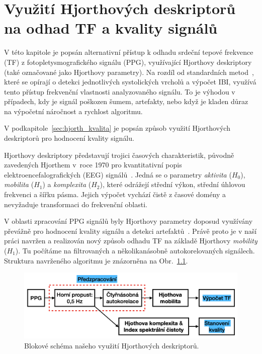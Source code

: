 \chapter{Využití Hjorthových deskriptorů na odhad TF a kvality signálů}
\label{ch:hjorth}
V této kapitole je popsán alternativní přístup k odhadu srdeční tepové frekvence (\acs{TF}) z fotopletysmografického signálu (\acs{PPG}), využívající Hjorthovy deskriptory (také označované jako Hjorthovy parametry).
Na rozdíl od standardních metod~\cite{ENIKÖ,Charlton2022,NeuroKit2}, které se opírají o detekci jednotlivých systolických vrcholů a výpočet \acs{IBI}, využívá tento přístup frekvenční vlastnosti analyzovaného signálu.
To je výhodou v případech, kdy je signál poškozen šumem, artefakty, nebo když je kladen důraz na výpočetní náročnost a rychlost algoritmu.

V podkapitole~\ref{sec:hjorth_kvalita} je popsán způsob využití Hjorthových deskriptorů pro hodnocení kvality signálu. %

Hjorthovy deskriptory představují trojici časových charakteristik, původně zavedených Hjorthem v~roce 1970 pro kvantitativní popis elektroencefalografických (\acs{EEG}) signálů~\cite{Hjorth1973}.
Jedná se o parametry \textit{aktivita} (\(H_0\)), \textit{mobilita} (\(H_1\)) a \textit{komplexita} (\(H_2\)), které odrážejí střední výkon, střední úhlovou frekvenci a šířku pásma.
Jejich výpočet vychází čistě z časové domény a nevyžaduje transformaci do frekvenční oblasti.

V oblasti zpracování \acs{PPG} signálů byly Hjorthovy parametry doposud využívány převážně pro hodnocení kvality signálu a detekci artefaktů~\cite{Peralta2017}. %
Právě proto je v naší práci navržen a realizován nový způsob odhadu \acs{TF} na základě Hjorthovy \textit{mobility} (\(H_1\)).
Tu počítáme na filtrovaných a několikanásobně autokorelovaných signálech.
Struktura navrženého algoritmu je znázorněna na Obr.~\ref{fig:hjorth_schemata}.

\begin{figure}[h]
	\centering
	\includegraphics[width=1\textwidth]{./obrazky/hjorth_schema.png} %
	\caption[Schéma našeho algorimu, který využívá Hjorthových deskriptorů]{Blokové schéma našeho využití Hjorthových deskriptorů.}
	\label{fig:hjorth_schemata}
\end{figure}

